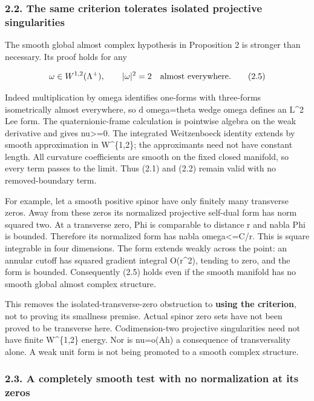 \documentclass[
  10pt,
]{article}
\begin{document}
\hypertarget{the-same-criterion-tolerates-isolated-projective-singularities}{%
\subsubsection{2.2. The same criterion tolerates isolated projective
singularities}\label{the-same-criterion-tolerates-isolated-projective-singularities}}

The smooth global almost complex hypothesis in Proposition 2 is stronger
than necessary. Its proof holds for any

\[
 \omega\in W^{1,2}(\Lambda^+),\qquad |\omega|^2=2
 \quad\hbox{almost everywhere}.                       \tag{2.5}
\]

Indeed multiplication by omega identifies one-forms with three-forms
isometrically almost everywhere, so d omega=theta wedge omega defines an
L\^{}2 Lee form. The quaternionic-frame calculation is pointwise algebra
on the weak derivative and gives nu\textgreater=0. The integrated
Weitzenboeck identity extends by smooth approximation in W\^{}\{1,2\};
the approximants need not have constant length. All curvature
coefficients are smooth on the fixed closed manifold, so every term
passes to the limit. Thus (2.1) and (2.2) remain valid with no
removed-boundary term.

For example, let a smooth positive spinor have only finitely many
transverse zeros. Away from these zeros its normalized projective
self-dual form has norm squared two. At a transverse zero,
\textbar Phi\textbar{} is comparable to distance r and \textbar nabla
Phi\textbar{} is bounded. Therefore its normalized form has
\textbar nabla omega\textbar\textless=C/r. This is square integrable in
four dimensions. The form extends weakly across the point: an annular
cutoff has squared gradient integral O(r\^{}2), tending to zero, and the
form is bounded. Consequently (2.5) holds even if the smooth manifold
has no smooth global almost complex structure.

This removes the isolated-transverse-zero obstruction to \textbf{using
the criterion}, not to proving its smallness premise. Actual spinor zero
sets have not been proved to be transverse here. Codimension-two
projective singularities need not have finite W\^{}\{1,2\} energy. Nor
is nu=o(Ah) a consequence of transversality alone. A weak unit form is
not being promoted to a smooth complex structure.

\hypertarget{a-completely-smooth-test-with-no-normalization-at-its-zeros}{%
\subsubsection{2.3. A completely smooth test with no normalization at
its
zeros}\label{a-completely-smooth-test-with-no-normalization-at-its-zeros}}
\end{document}

